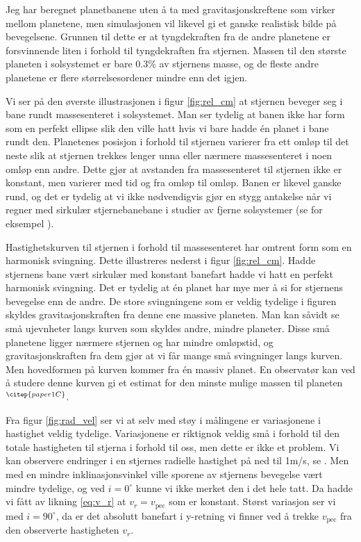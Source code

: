 \documentclass[reprint, english,notitlepage]{revtex4-1}  %
\begin{document}
Jeg har beregnet planetbanene uten å ta med gravitasjonskreftene som virker mellom planetene, men simulasjonen vil likevel gi et ganske realistisk bilde på bevegelsene. Grunnen til dette er at tyngdekraften fra de andre planetene er forsvinnende liten i forhold til tyngdekraften fra stjernen. Massen til den største planeten i solsystemet er bare 0.3\% av stjernens masse, og de fleste andre planetene er flere størrelsesordener mindre enn det igjen.

Vi ser på den øverste illustrasjonen i figur \ref{fig:rel_cm} at stjernen beveger seg i bane rundt massesenteret i solsystemet. Man ser tydelig at banen ikke har form som en perfekt ellipse slik den ville hatt hvis vi bare hadde én planet i bane rundt den. Planetenes posisjon i forhold til stjernen varierer fra ett omløp til det neste slik at stjernen trekkes lenger unna eller nærmere massesenteret i noen omløp enn andre. Dette gjør at avstanden fra massesenteret til stjernen ikke er konstant, men varierer med tid og fra omløp til omløp. Banen er likevel ganske rund, og det er tydelig at vi ikke nødvendigvis gjør en stygg antakelse når vi regner med sirkulær stjernebanebane i studier av fjerne solsystemer (se for eksempel \citep{paper1C}).

Hastighetskurven til stjernen i forhold til massesenteret har omtrent form som en harmonisk svingning. Dette illustreres nederst i figur \ref{fig:rel_cm}. Hadde stjernens bane vært sirkulær med konstant banefart hadde vi hatt en perfekt harmonisk svingning. Det er tydelig at én planet har mye mer å si for stjernens bevegelse enn de andre. De store svingningene som er veldig tydelige i figuren skyldes gravitasjonskraften fra denne ene massive planeten. Man kan såvidt se små ujevnheter langs kurven som skyldes andre, mindre planeter. Disse små planetene ligger nærmere stjernen og har mindre omløpstid, og gravitasjonskraften fra dem gjør at vi får mange små svingninger langs kurven. Men hovedformen på kurven kommer fra én massiv planet. En observatør kan ved å studere denne kurven gi et estimat for den minste mulige massen til planeten$^{\citep{paper1C}}$.

Fra figur \ref{fig:rad_vel} ser vi at selv med støy i målingene er variasjonene i hastighet
 veldig tydelige. Variasjonene er riktignok veldig små i forhold til den totale hastigheten til stjerna i forhold til oss, men dette er ikke et problem. Vi kan observere endringer i en stjernes radielle hastighet på ned til 1m/s, se \citep{part1C}. Men med en mindre inklinasjonsvinkel ville sporene av stjernens bevegelse vært mindre tydelige, og ved $i = 0^{\circ}$ kunne vi ikke merket den i det hele tatt. Da hadde vi fått av likning \ref{eq:v_r} at $v_r = v_{\text{pec}}$ som er konstant. Størst variasjon ser vi med $i = 90^{\circ}$, da er det absolutt banefart i y-retning vi finner ved å trekke $v_{\text{pec}}$ fra den observerte hastigheten $v_r$.
\end{document}
